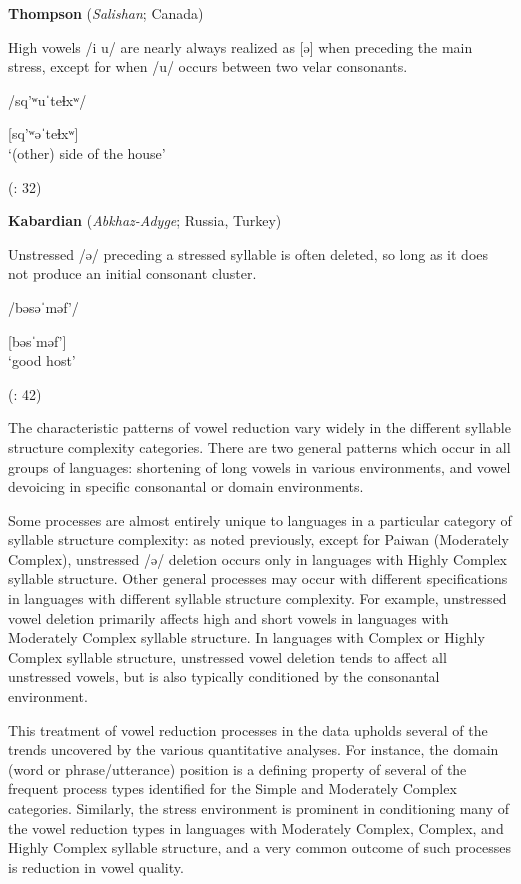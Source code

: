 \ea  \textbf{Thompson} (\textit{Salishan}; Canada)

High vowels /i u/ are nearly always realized as [ə] when preceding the main stress, except for when /u/ occurs between two velar consonants. 

/sq’ʷuˈteɬxʷ/

[sq’ʷəˈteɬxʷ]\\
\glt ‘(other) side of the house’

(\citealt{ThompsonThompson1992}: 32)

\ex  \textbf{Kabardian} (\textit{Abkhaz-Adyge}; Russia, Turkey) 

Unstressed /ə/ preceding a stressed syllable is often deleted, so long as it does not produce an initial consonant cluster.

/bəsəˈməf’/

[bəsˈməf’]\\
\glt ‘good host’

(\citealt{GordonApplebaum2010}: 42)
\z
\z

  The characteristic patterns of vowel reduction vary widely in the different syllable structure complexity categories. There are two general patterns which occur in all groups of languages: shortening of long vowels in various environments, and vowel devoicing in specific consonantal or domain environments. 

  Some processes are almost entirely unique to languages in a particular category of syllable structure complexity: as noted previously, except for Paiwan (Moderately Complex), unstressed /ə/ deletion occurs only in languages with Highly Complex syllable structure. Other general processes may occur with different specifications in languages with different syllable structure complexity. For example, unstressed vowel deletion primarily affects high and short vowels in languages with Moderately Complex syllable structure. In languages with Complex or Highly Complex syllable structure, unstressed vowel deletion tends to affect all unstressed vowels, but is also typically conditioned by the consonantal environment.

  This treatment of vowel reduction processes in the data upholds several of the trends uncovered by the various quantitative analyses. For instance, the domain (word or phrase/utterance) position is a defining property of several of the frequent process types identified for the Simple and Moderately Complex categories. Similarly, the stress environment is prominent in conditioning many of the vowel reduction types in languages with Moderately Complex, Complex, and Highly Complex syllable structure, and a very common outcome of such processes is reduction in vowel quality.

